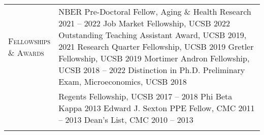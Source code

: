\documentclass[11pt]{article}
\newcommand{\xspace}{19pt}
\begin{document}
\begin{tabularx}{\textwidth}{@{}Y Z@{}}
	\textsc{Fellowships \newline \& Awards} & 
	NBER Pre-Doctoral Fellow, Aging \& Health Research \hfill 2021 -- 2022%
	\vspace{12pt} \newline
	Job Market Fellowship, UCSB \hfill 2022%
	\vspace{3pt} \newline
	Outstanding Teaching Assistant Award, UCSB \hfill 2019, 2021%
	\vspace{3pt} \newline
	Research Quarter Fellowship, UCSB \hfill 2019%
	\vspace{3pt} \newline
	Gretler Fellowship, UCSB \hfill 2019%
	\vspace{3pt} \newline 
	Mortimer Andron Fellowship, UCSB \hfill 2018 -- 2022%
	\vspace{3pt} \newline 
	Distinction in Ph.D. Preliminary Exam, Microeconomics, UCSB \hfill 2018%
		\\ \newpage & %
	Regents Fellowship, UCSB \hfill 2017 -- 2018%
	\vspace{3pt} \newline
	Phi Beta Kappa \hfill 2013%
	\vspace{3pt} \newline
	Edward J. Sexton PPE Fellow, CMC \hfill 2011 -- 2013%
	\vspace{3pt} \newline
	Dean's List, CMC \hfill 2010 -- 2013%
	 \\ \addlinespace[\xspace]  


\end{tabularx}
\end{document}
